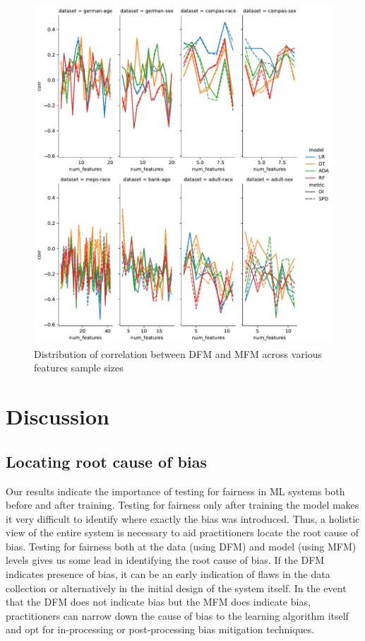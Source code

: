 \documentclass{article}
\begin{document}
\begin{figure}
  \centering
  \includegraphics[width=0.95\linewidth]{lineplot--num-features--corr.pdf}
  \caption{Distribution of correlation between DFM and MFM across
    various features sample sizes}
  \label{fig:lineplot--num-features--corr}
\end{figure}

\section{Discussion}\label{sec:discuss}

\subsection{Locating root cause of bias}\label{sec:discuss-root-cause-bias}

Our results indicate the importance of testing for fairness in ML
systems both before and after training. Testing for fairness only
after training the model makes it very difficult to identify where
exactly the bias was introduced. Thus, a holistic view of the entire
system is necessary to aid practitioners locate the root cause of
bias. Testing for fairness both at the data (using DFM) and model
(using MFM) levels gives us some lead in identifying the root cause of
bias. If the DFM indicates presence of bias, it can be an early
indication of flaws in the data collection or alternatively in the
initial design of the system itself. In the event that the DFM does
not indicate bias but the MFM does indicate bias, practitioners can
narrow down the cause of bias to the learning algorithm itself and opt
for in-processing or post-processing bias mitigation techniques.
\end{document}
